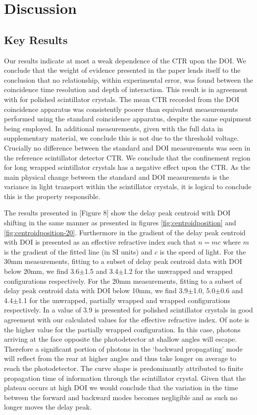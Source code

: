 \section{Discussion}
\label{sec:discussion}
\subsection{Key Results}
Our results indicate at most a weak dependence of the CTR upon the DOI. We conclude that the weight of evidence presented in the paper lends itself to the conclusion that no relationship, within experimental error, was found between the coincidence time resolution and depth of interaction. This result is in agreement with \cite{Bircher_Shao_2012} for polished scintillator crystals. The mean CTR recorded from the DOI coincidence apparatus was consistently poorer than equivalent measurements performed using the standard coincidence apparatus, despite the same equipment being employed. In additional measurements, given with the full data in supplementary material, we conclude this is not due to the threshold voltage. Crucially no difference between the standard and DOI measurements was seen in the reference scintillator detector CTR. We conclude that the confinement region for long wrapped scintillator crystals has a negative effect upon the CTR. As the main physical change between the standard and DOI measurements is the variance in light transport within the scintillator crystals, it is logical to conclude this is the property responsible.

The results presented in [Figure 8]\cite{Moses_Derenzo_1999} show the delay peak centroid with DOI shifting in the same manner as presented in figures \ref{fig:centroidposition} and \ref{fig:centroidposition-20}. Furthermore in \cite{Moses_Derenzo_1999} the gradient of  the delay peak centroid with DOI is presented as an effective refractive index such that $n=mc$ where $m$ is the gradient of the fitted line (in SI units) and $c$ is the speed of light. For the 30mm measurements, fitting to a subset of delay peak centroid data with DOI below 20mm, we find 3.6$\pm$1.5 and 3.4$\pm$1.2 for the unwrapped and wrapped configurations respectively.  For the 20mm measurements, fitting to a subset of delay peak centroid data with DOI below 10mm, we find 3.9$\pm$1.0, 5.0$\pm$0.6 and 4.4$\pm$1.1 for the unwrapped, partially wrapped and wrapped configurations respectively. In \cite{Moses_Derenzo_1999} a value of 3.9 is presented for polished scintillator crystals in good agreement with our calculated values for the effective refractive index. Of note is the higher value for the partially wrapped configuration. In this case, photons arriving at the face opposite the photodetector at shallow angles will escape. Therefore a significant portion of photons in the `backward propagating' mode will reflect from the rear at higher angles and thus take longer on average to reach the photodetector. The curve shape is predominantly attributed to finite propagation time of information through the scintillator crystal. Given that the plateau occurs at high DOI we would conclude that the variation in the time between the forward and backward modes becomes negligible and as such no longer moves the delay peak.

